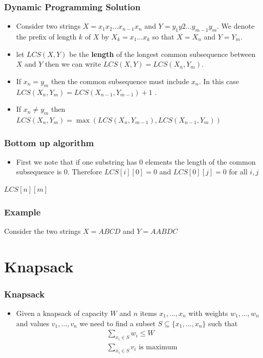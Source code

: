 \documentclass{beamer}
\begin{document}
\begin{frame}
  \frametitle{Dynamic Programming Solution}
  \begin{itemize}
  \item Consider two strings $X=x_1x_2\ldots x_{n-1}x_n$ and $Y=y_1y2\ldots y_{m-1}y_m$. We denote the prefix of length $k$ of $X$ by $X_k=x_1\ldots x_k$  so that $X=X_n$ and $Y=Y_m$.
\item  let $LCS(X,Y)$ be the \textbf{length} of the longest common subsequence between $X$ and $Y$ then we can write $LCS(X,Y)=LCS(X_n,Y_m)$.
  \item If $x_n=y_m$ then the common subsequence must include $x_n$. In this case $LCS(X_n,Y_m)=LCS(X_{n-1},Y_{m-1})+1$ .
  \item If $x_n\neq y_m$ then $LCS(X_n,Y_m)=\max (LCS(X_n,Y_{m-1}),LCS(X_{n-1},Y_m))$
  \end{itemize}
\end{frame}

\begin{frame}
  \frametitle{Bottom up algorithm}
  \begin{itemize}
  \item First we note that if one substring has 0 elements the length of the common subsequence is 0. Therefore $LCS[i][0]=0$ and $LCS[0][j]=0$ for all $i,j$
  \end{itemize}

\begin{algorithm}[H]
 
  \DontPrintSemicolon
  \BlankLine


\Return $LCS[n][m]$\;  
\end{algorithm}
\end{frame}
\begin{frame}
  \frametitle{Example}
  Consider the two strings $X=ABCD$ and $Y=AABDC$
\end{frame}
\section{Knapsack}
\begin{frame}
  \frametitle{Knapsack}
  
  \begin{itemize}
  \item Given a knapsack of capacity $W$ and $n$ items $x_1,\ldots ,x_n$ with weights $w_1,\ldots,w_n$ and values $v_1,\ldots,v_n$ we need to find a subset $S\subseteq\{x_1,\ldots,x_n\}$ such that
    \begin{align*}
      &\sum_{x_i\in S}w_i\le W \\
      &\sum_{x_i\in S}v_i\text{ is maximum}  \\
    \end{align*}
  \end{itemize}
\end{frame}
\end{document}
